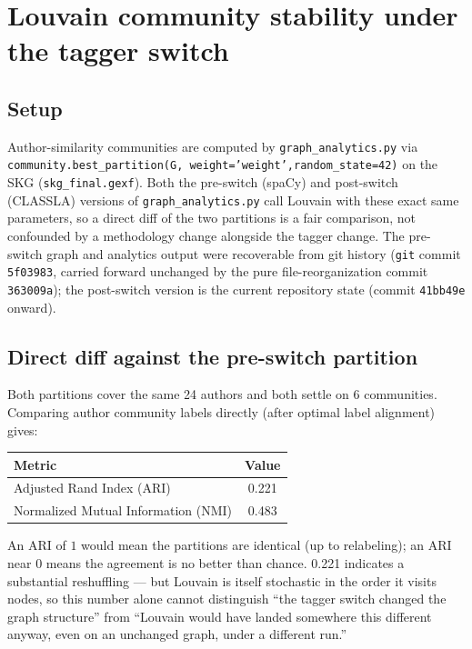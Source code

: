\documentclass[11pt]{article}
\begin{document}
\section{Louvain community stability under the tagger switch}
\label{sec:louvain}

\subsection{Setup}

Author-similarity communities are computed by
\texttt{graph\_analytics.py} via \texttt{community.best\_partition(G,\allowbreak
weight='weight',\allowbreak random\_state=42)} on the SKG
(\texttt{skg\_final.gexf}). Both the pre-switch (spaCy) and post-switch
(CLASSLA) versions of \texttt{graph\_analytics.py} call Louvain with these
exact same parameters, so a direct diff of the two partitions is a fair
comparison, not confounded by a methodology change alongside the tagger
change. The pre-switch graph and analytics output were recoverable from git
history (\texttt{git} commit \texttt{5f03983}, carried forward unchanged by
the pure file-reorganization commit \texttt{363009a}); the post-switch
version is the current repository state (commit \texttt{41bb49e} onward).

\subsection{Direct diff against the pre-switch partition}

Both partitions cover the same 24 authors and both settle on 6 communities.
Comparing author community labels directly (after optimal label alignment)
gives:

\begin{center}
\begin{tabular}{lc}
\toprule
Metric & Value \\
\midrule
Adjusted Rand Index (ARI) & 0.221 \\
Normalized Mutual Information (NMI) & 0.483 \\
\bottomrule
\end{tabular}
\end{center}

An ARI of $1$ would mean the partitions are identical (up to relabeling); an
ARI near $0$ means the agreement is no better than chance. 0.221 indicates a
substantial reshuffling — but Louvain is itself stochastic in the order it
visits nodes, so this number alone cannot distinguish ``the tagger switch
changed the graph structure'' from ``Louvain would have landed somewhere
this different anyway, even on an unchanged graph, under a different run.''
\end{document}
